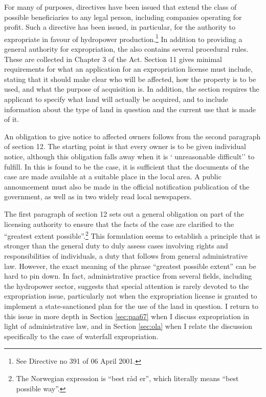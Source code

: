 For many of purposes, directives have been issued that extend the class of possible beneficiaries to any legal person, including companies operating for profit. Such a directive has been issued, in particular, for the authority to expropriate in favour of hydropower production.\footnote{See Directive no 391 of 06 April 2001.} In addition to providing a general authority for expropriation, the \cite{ea59} also contains several procedural rules. These are collected in Chapter 3 of the Act. Section 11 gives minimal requirements for what an application for an expropriation license must include, stating that it should make clear who will be affected, how the property is to be used, and what the purpose of acquisition is. In addition, the section requires the applicant to specify what land will actually be acquired, and to include information about the type of land in question and the current use that is made of it.

An obligation to give notice to affected owners follows from the second paragraph of section 12. The starting point is that every owner is to be given individual notice, although this obligation falls away when it is ` unreasonable difficult'' to fulfill. In this is found to be the case, it is sufficient that the documents of the case are made available at a suitable place in the local area. A public announcement must also be made in the official notification publication of the government, as well as in two widely read local newspapers.

The first paragraph of section 12 sets out a general obligation on part of the licensing authority to ensure that the facts of the case are clarified to the ``greatest extent possible''.\footnote{The Norwegian expression is ``best råd er'', which literally means ``best possible way''.} This formulation seems to establish a principle that is stronger than the general duty to duly assess cases involving rights and responsibilities of individuals, a duty that follows from general administrative law. However, the exact meaning of the phrase  ``greatest possible extent'' can be hard to pin down. In fact, administrative practice from several fields, including the hydropower sector, suggests that special attention is rarely devoted to the expropriation issue, particularly not when the expropriation license is granted to implement a state-sanctioned plan for the use of the land in question. I return to this issue in more depth in Section \ref{sec:paa67} when I discuss expropriation in light of administrative law, and in Section \ref{sec:ola} when I relate the discussion specifically to the case of waterfall expropriation.

